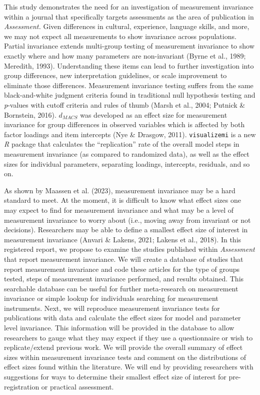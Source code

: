 \documentclass[
  man]{apa7}
\begin{document}
This study demonstrates the need for an investigation of measurement invariance within a journal that specifically targets assessments as the area of publication in \emph{Assessment.} Given differences in cultural, experience, language skills, and more, we may not expect all measurements to show invariance across populations. Partial invariance extends multi-group testing of measurement invariance to show exactly where and how many parameters are non-invariant (Byrne et al., 1989; Meredith, 1993). Understanding these items can lead to further investigation into group differences, new interpretation guidelines, or scale improvement to eliminate those differences. Measurement invariance testing suffers from the same black-and-white judgment criteria found in traditional null hypothesis testing and \emph{p}-values with cutoff criteria and rules of thumb (Marsh et al., 2004; Putnick \& Bornstein, 2016). \(d_{MACS}\) was developed as an effect size for measurement invariance for group differences in observed variables which is affected by both factor loadings and item intercepts (Nye \& Drasgow, 2011). \texttt{visualizemi} is a new \emph{R} package that calculates the ``replication'' rate of the overall model steps in measurement invariance (as compared to randomized data), as well as the effect sizes for individual parameters, separating loadings, intercepts, residuals, and so on.

As shown by Maassen et al. (2023), measurement invariance may be a hard standard to meet. At the moment, it is difficult to know what effect sizes one may expect to find for measurement invariance and what may be a level of measurement invariance to worry about (i.e., moving away from invariant or not decisions). Researchers may be able to define a smallest effect size of interest in measurement invariance (Anvari \& Lakens, 2021; Lakens et al., 2018). In this registered report, we propose to examine the studies published within \emph{Assessment} that report measurement invariance. We will create a database of studies that report measurement invariance and code these articles for the type of groups tested, steps of measurement invariance performed, and results obtained. This searchable database can be useful for further meta-research on measurement invariance or simple lookup for individuals searching for measurement instruments. Next, we will reproduce measurement invariance tests for publications with data and calculate the effect sizes for model and parameter level invariance. This information will be provided in the database to allow researchers to gauge what they may expect if they use a questionnaire or wish to replicate/extend previous work. We will provide the overall summary of effect sizes within measurement invariance tests and comment on the distributions of effect sizes found within the literature. We will end by providing researchers with suggestions for ways to determine their smallest effect size of interest for pre-registration or practical assessment.
\end{document}
